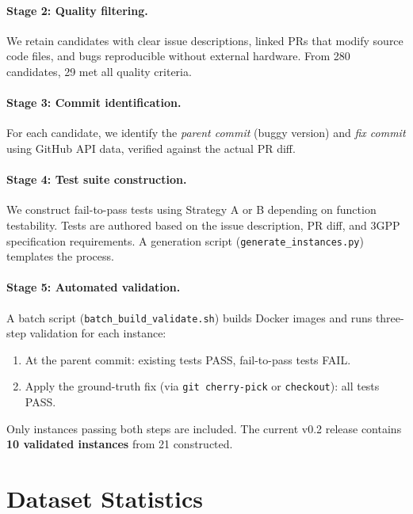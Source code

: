 \documentclass{article}
\begin{document}
\paragraph{Stage 2: Quality filtering.} We retain candidates with clear issue descriptions, linked PRs that modify source code files, and bugs reproducible without external hardware. From 280 candidates, 29 met all quality criteria.

\paragraph{Stage 3: Commit identification.} For each candidate, we identify the \emph{parent commit} (buggy version) and \emph{fix commit} using GitHub API data, verified against the actual PR diff.

\paragraph{Stage 4: Test suite construction.} We construct fail-to-pass tests using Strategy A or B depending on function testability. Tests are authored based on the issue description, PR diff, and 3GPP specification requirements. A generation script (\texttt{generate\_instances.py}) templates the process.

\paragraph{Stage 5: Automated validation.} A batch script (\texttt{batch\_build\_validate.sh}) builds Docker images and runs three-step validation for each instance:
\begin{enumerate}
    \item At the parent commit: existing tests PASS, fail-to-pass tests FAIL.
    \item Apply the ground-truth fix (via \texttt{git cherry-pick} or \texttt{checkout}): all tests PASS.
\end{enumerate}
Only instances passing both steps are included. The current v0.2 release contains \textbf{10 validated instances} from 21 constructed.

\section{Dataset Statistics}
\end{document}
